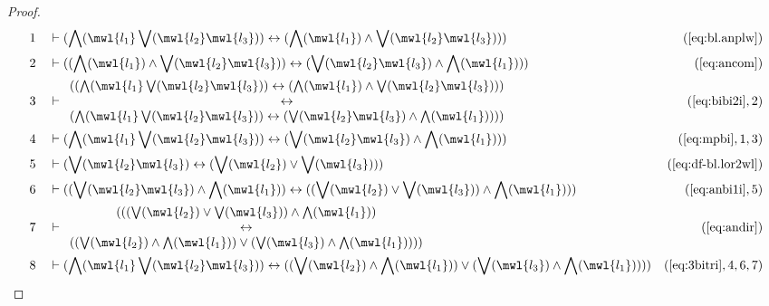 \begin{proof}
\begin{align}
  1 &&  & \vdash ( \bigwedge( \mwl{l_1} \bigvee( \mwl{l_2} \mwl{l_3} ) )
     \leftrightarrow ( \bigwedge( \mwl{l_1} ) \wedge
     \bigvee( \mwl{l_2} \mwl{l_3} ) )
     )&(\mbox{\ref{eq:bl.anplw}})\notag
  \\ 2 &&  & \vdash ( ( \bigwedge( \mwl{l_1} ) \wedge \bigvee( \mwl{l_2}
     \mwl{l_3} ) ) \leftrightarrow ( \bigvee( \mwl{l_2}
     \mwl{l_3} ) \wedge \bigwedge( \mwl{l_1} ) )
     )&(\mbox{\ref{eq:ancom}})\notag
  \\ 3 &&  & \vdash 
    \begin{array}{c}
    ( ( \bigwedge( \mwl{l_1} \bigvee( \mwl{l_2} \mwl{l_3} ) )
     \leftrightarrow ( \bigwedge( \mwl{l_1} ) \wedge
     \bigvee( \mwl{l_2} \mwl{l_3} ) ) )  \\
      \leftrightarrow \\ (
     \bigwedge( \mwl{l_1} \bigvee( \mwl{l_2} \mwl{l_3} ) )
     \leftrightarrow ( \bigvee( \mwl{l_2} \mwl{l_3} )
     \wedge \bigwedge( \mwl{l_1} ) ) )
     )
     \end{array}
     &(\mbox{\ref{eq:bibi2i}},2)\notag
  \\ 4 &&  & \vdash ( \bigwedge( \mwl{l_1} \bigvee( \mwl{l_2} \mwl{l_3} ) )
     \leftrightarrow ( \bigvee( \mwl{l_2} \mwl{l_3} )
     \wedge \bigwedge( \mwl{l_1} ) )
     )&(\mbox{\ref{eq:mpbi}},1,3)\notag
  \\ 5 &&  & \vdash ( \bigvee( \mwl{l_2} \mwl{l_3} ) \leftrightarrow ( \bigvee(
     \mwl{l_2} ) \vee \bigvee( \mwl{l_3} ) )
     )&(\mbox{\ref{eq:df-bl.lor2wl}})\notag
  \\ 6 &&  & \vdash ( ( \bigvee( \mwl{l_2} \mwl{l_3} ) \wedge \bigwedge(
     \mwl{l_1} ) ) \leftrightarrow ( ( \bigvee( \mwl{l_2}
     ) \vee \bigvee( \mwl{l_3} ) ) \wedge \bigwedge(
     \mwl{l_1} ) ) )&(\mbox{\ref{eq:anbi1i}},5)\notag
  \\ 7 &&  & \vdash 
    \begin{array}{c}  
     ( ( ( \bigvee( \mwl{l_2} ) \vee \bigvee( \mwl{l_3} ) )
     \wedge \bigwedge( \mwl{l_1} ) ) \\
      \leftrightarrow \\ ( (
     \bigvee( \mwl{l_2} ) \wedge \bigwedge( \mwl{l_1} ) )
     \vee ( \bigvee( \mwl{l_3} ) \wedge \bigwedge(
     \mwl{l_1} ) ) ) )
     \end{array}
        &(\mbox{\ref{eq:andir}})\notag
  \\ 8 &&  & \vdash ( \bigwedge( \mwl{l_1} \bigvee( \mwl{l_2} \mwl{l_3} ) )
     \leftrightarrow ( ( \bigvee( \mwl{l_2} ) \wedge
     \bigwedge( \mwl{l_1} ) ) \vee ( \bigvee( \mwl{l_3} )
     \wedge \bigwedge( \mwl{l_1} ) ) )
     )&(\mbox{\ref{eq:3bitri}},4,6,7)\notag
\end{align}
\end{proof}

